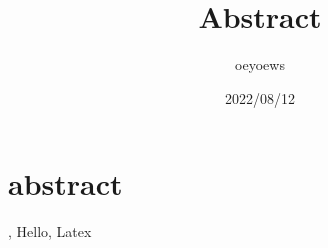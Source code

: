 \documentclass[UTF8]{article}
\title{Abstract \emoji{rocket}}
\author{oeyoews}
\date{2022/08/12}
\begin{document}
\maketitle

\section{abstract }%
\label{sec:emoji}

, Hello, Latex
\end{document}

